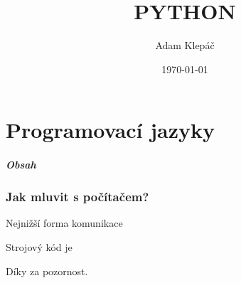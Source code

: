 \documentclass[aspectratio=169,11pt]{beamer}
\title{PYTHON}
\date{\today}
\author{Adam Klepáč}
\institute[GEVO]{Gymnázium Evolution Jižní Město}
\begin{document}
\maketitle

\part[Programovací jazyky]{Programovací jazyky}

\begin{frame}[plain]
 \partpage
\end{frame}

\begin{frame}
 \frametitle{Obsah}
 \tableofcontents
\end{frame}

\section[Jak mluvit s počítačem?]{Jak mluvit s počítačem?}

\begin{frame}{Nejnižší forma komunikace}
 \begin{tcolorbox}[title=Strojový kód]
  Strojový kód je 
 \end{tcolorbox}
\end{frame}

\begin{frame}[plain]
 \centering\Huge Díky za pozornost.
\end{frame}
\end{document}
